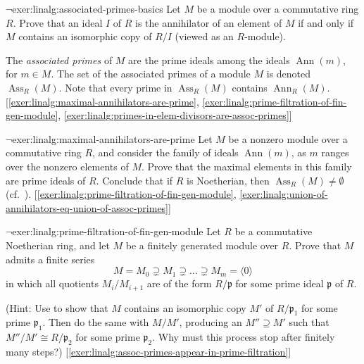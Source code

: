 \begin{exer}{$\lnot$}{exer:linalg:associated-primes-basics}
  Let $M$ be a module over a commutative ring $R$. Prove that an ideal
  $I$ of $R$ is the annihilator of an element of $M$ if and only if
  $M$ contains an isomorphic copy of $R/I$ (viewed as an $R$-module).

  The \emph{associated primes} of $M$ are the prime ideals among the
  ideals $\operatorname{Ann}(m)$, for $m \in M$. The set of the
  associated primes of a module $M$ is denoted
  $\operatorname{Ass}_R(M)$. Note that every prime in
  $\operatorname{Ass}_R(M)$ contains
  $\operatorname{Ann}_R(M)$. [\ref{exer:linalg:maximal-annihilators-are-prime},
  \ref{exer:linalg:prime-filtration-of-fin-gen-module},
  \ref{exer:linalg:primes-in-elem-divisors-are-assoc-primes}]
\end{exer}
\begin{exer}{$\lnot$}{exer:linalg:maximal-annihilators-are-prime}
  Let $M$ be a nonzero module over a commutative ring $R$, and consider the
  family of ideals $\operatorname{Ann}(m)$, as $m$ ranges over the
  nonzero elements of $M$. Prove that the maximal elements in this
  family are prime ideals of $R$. Conclude that if $R$ is Noetherian,
  then $\operatorname{Ass}_R(M) \neq \emptyset$ (cf.\
  ).
  [\ref{exer:linalg:prime-filtration-of-fin-gen-module},
  \ref{exer:linalg:union-of-annihilators-eq-union-of-assoc-primes}]
\end{exer}
\begin{exer}{$\lnot$}{exer:linalg:prime-filtration-of-fin-gen-module}
  Let $R$ be a commutative Noetherian ring, and let $M$ be a finitely
  generated module over $R$. Prove that $M$ admits a finite series
  \[
    M = M_0 \supsetneq M_1 \supsetneq \dots \supsetneq M_m = \langle 0
    \rangle
  \]
  in which all quotients $M_i/M_{i+1}$ are of the form
  $R/\mathfrak{p}$ for some prime ideal $\mathfrak{p}$ of $R$.

  (Hint: Use
  to show that $M$ contains an
  isomorphic copy $M'$ of $R/\mathfrak{p}_1$ for some prime
  $\mathfrak{p}_1$. Then do the same with $M/M'$, producing an
  $M'' \supseteq M'$ such that $M''/M' \cong R/\mathfrak{p}_2$ for
  some prime $\mathfrak{p}_2$. Why must this process stop after
  finitely many steps?)
  [\ref{exer:linalg:assoc-primes-appear-in-prime-filtration}]
\end{exer}
